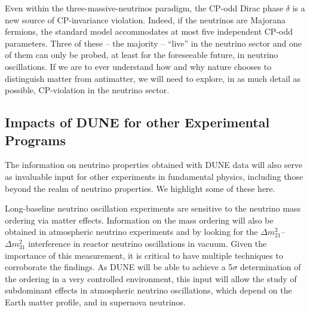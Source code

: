 Even within the three-massive-neutrinos paradigm, the CP-odd Dirac phase $\delta$ is a new source of CP-invariance violation. Indeed, if the neutrinos are Majorana fermions, the standard model accommodates at most five independent CP-odd parameters. Three of these -- the majority -- ``live'' in the neutrino sector and one of them can only be probed, at least for the foreseeable future, in neutrino oscillations. If we are to ever understand how and why nature chooses to distinguish matter from antimatter, we will need to explore, in as much detail as possible, CP-violation in the neutrino sector. 


\subsection{Impacts of DUNE for other Experimental Programs}



The information on neutrino properties obtained with DUNE data will also serve as invaluable input for other experiments in fundamental physics, including those beyond the realm of neutrino properties. We highlight some of these here. 

Long-baseline neutrino oscillation experiments are sensitive to the neutrino mass ordering via matter effects. Information on the mass ordering will also be obtained in atmospheric neutrino experiments and by looking for the $\Delta m^2_{21}$--$\Delta m^2_{31}$ interference in reactor neutrino oscillations in vacuum. Given the importance of this measurement, it is critical to have multiple techniques to corroborate the findings. As DUNE will be able to achieve a 5$\sigma$ determination of the ordering in a very controlled environment, this input will allow the study of subdominant effects in atmospheric neutrino oscillations, which depend on the Earth matter profile, and in supernova neutrinos.
%

